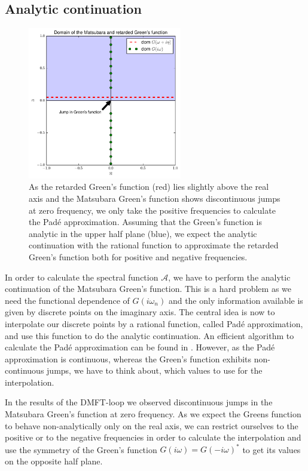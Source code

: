 \begin{appendix}
\section{Analytic continuation}
\begin{figure}[htb]
  \begin{center}
    \includegraphics[width=0.6\textwidth]{analytic_continuation}
  \end{center}
  \caption{As the retarded Green's function (red) lies slightly above the real axis and the Matsubara Green's function shows discontinuous jumps at zero frequency, we only take the positive frequencies to calculate the Padé approximation. Assuming that the Green's function is analytic in the upper half plane (blue), we expect the analytic continuation with the rational function to approximate the retarded Green's function both for positive and negative frequencies. }
  \label{fig:analytic_continuation}
\end{figure}


In order to calculate the spectral function $\mathcal{A}$, we have to perform the analytic continuation of the Matsubara Green's function.
This is a hard problem as we need the functional dependence of $G(iω_n)$ and the only information available is given by discrete points on the imaginary axis.
The central idea is now to interpolate our discrete points by a rational function, called Padé approximation, and use this function to do the analytic continuation. 
An efficient algorithm to calculate the Padé approximation can be found in \cite{padepaper}. However, as the Padé approximation is continuous, whereas the Green's function exhibits non-continuous jumps, we have to think about, which values to use for the interpolation.

In the results of the DMFT-loop we observed discontinuous jumps in the Matsubara Green's function at zero frequency.
As we expect the Greens function to behave non-analytically only on the real axis, we can restrict ourselves to the positive or to the negative frequencies in order to calculate the interpolation and use the symmetry of the Green's function $G(iω)=G(-iω)^*$ to get its values on the opposite half plane.


\end{appendix}
